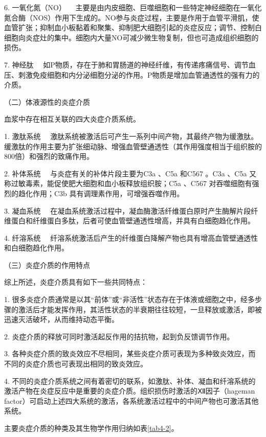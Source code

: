 {6. 一氧化氮（NO）}
　主要是由内皮细胞、巨噬细胞和一些特定神经细胞在一氧化氮合酶（NOS）作用下生成的。NO参与炎症过程，主要是作用于血管平滑肌，使血管扩张；抑制血小板黏着和聚集、抑制肥大细胞引起的炎症反应；调节、控制白细胞向炎症灶的集中。细胞内大量NO可减少微生物复制，但也可造成组织细胞的损伤。

{7. 神经肽}
　如P物质，存在于肺和胃肠道的神经纤维，有传递疼痛信号、调节血压、刺激免疫细胞和内分泌细胞分泌的作用。P物质是增加血管通透性的强有力的介质。

{（二）体液源性的炎症介质}

血浆中存在相互关联的四大炎症介质系统。

{1. 激肽系统}
　激肽系统被激活后可产生一系列中间产物，其最终产物为缓激肽。缓激肽的作用主要为扩张细动脉、增强血管壁通透性（其作用强度相当于组织胺的800倍）和强烈的致痛作用。

{2. 补体系统} 　与炎症有关的补体片段主要为C{3a} 、C{5a} 和C{567} 。C{3a}
、C{5a} 又称过敏毒素，能促使肥大细胞和血小板释放组织胺；C{5a} 、C{567}
对吞噬细胞有强烈的趋化作用；C{3b} 具有调理素作用，可增强吞噬作用。

{3. 凝血系统}
　在凝血系统激活过程中，凝血酶激活纤维蛋白原时产生酶解片段纤维蛋白和纤维蛋白多肽，后者可使血管壁通透性增高，并具有白细胞趋化作用。

{4. 纤溶系统}
　纤溶系统激活后产生的纤维蛋白降解产物也具有增高血管壁通透性和白细胞趋化作用。

{（三）炎症介质的作用特点}

综上所述，炎症介质具有如下一些共同特点：

1.
很多炎症介质通常是以其``前体''或``非活性''状态存在于体液或细胞之中，经多步骤的激活后才能发挥作用，其活性状态的半衰期往往较短，一旦释放或激活，即被迅速灭活破坏，从而维持动态平衡。

2. 炎症介质的释放可同时激活起反作用的拮抗物，起到负反馈调节作用。

3.
各种炎症介质的致炎效应不尽相同，某些炎症介质可表现为多种致炎效应，而不同的炎症介质也可表现出相同的致炎效应。

4.
不同的炎症介质系统之间有着密切的联系，如激肽、补体、凝血和纤溶系统的激活产物在炎症反应中是重要的炎症介质。组织损伤时激活的Ⅻ因子（hageman
factor）可启动上述四大系统的激活，各系统激活过程中的中间产物也可激活其他系统。

主要炎症介质的种类及其生物学作用归纳如表\ref{tab4-2}。

